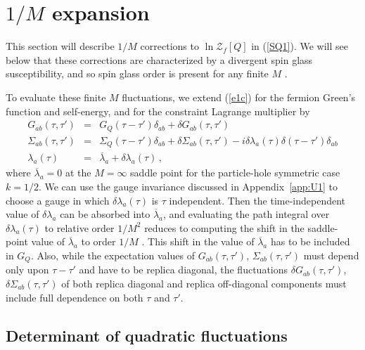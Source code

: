 \documentclass[aps,prx,preprint,onecolumn,citeautoscript,superscriptaddress,nofootinbib,
eqsecnum]{revtex4}
\def\bea{\begin{eqnarray}}
\def\eea{\end{eqnarray}}
\begin{document}
\section{$1/M$ expansion}
\label{sec:1M}

This section will describe $1/M$ corrections to $\ln \mathcal{Z}_f [ Q]$ in (\ref{SQ1}). We will see below that these corrections are characterized by a divergent spin glass susceptibility, and so spin glass order is present for any finite $M$ \cite{GPS01}.

To evaluate these finite $M$ fluctuations, 
we extend (\ref{e1c}) for the fermion Green's function and self-energy, and for the constraint Lagrange multiplier by
\bea
G_{ab} (\tau, \tau') &=&  G_Q (\tau-\tau') \delta_{ab}  + \delta G_{ab} (\tau, \tau') \nonumber \\
 \Sigma_{ab} (\tau, \tau') &=&  \Sigma_Q (\tau-\tau') \delta_{ab} + \delta \Sigma_{ab} (\tau, \tau') - i \delta \lambda_a (\tau) \delta(\tau - \tau') \delta_{ab} \nonumber \\
 \lambda_a (\tau) &=& \overline{\lambda}_a + \delta \lambda_a (\tau) \,, \label{e5}
\eea
where $\overline{\lambda}_a = 0$ at the $M=\infty$ saddle point for the particle-hole symmetric case $k=1/2$. We can use the gauge invariance discussed in Appendix~\ref{app:U1} to choose a gauge in which $\delta \lambda_a (\tau)$ is $\tau$ independent. Then the time-independent value of $\delta \lambda_a$ can be absorbed into $\overline{\lambda}_a$, and evaluating the path integral over $\delta \lambda_a (\tau)$ to relative order $1/M^2$ reduces to computing the shift in the saddle-point value of $\overline{\lambda}_a$ to order $1/M$ \cite{ReadNewns,CSY}. This shift in the value of $\overline{\lambda}_a$ has to be included in $G_Q$.
Also, while the expectation values of $G_{ab} (\tau, \tau')$, $\Sigma_{ab} (\tau, \tau')$ must depend only upon $\tau-\tau'$ and have to be replica diagonal, the fluctuations $\delta G_{ab} (\tau, \tau')$, $\delta \Sigma_{ab} (\tau, \tau')$ of both replica diagonal and replica off-diagonal components must include full dependence on both $\tau$ and $\tau'$.

\subsection{Determinant of quadratic fluctuations}
\end{document}
